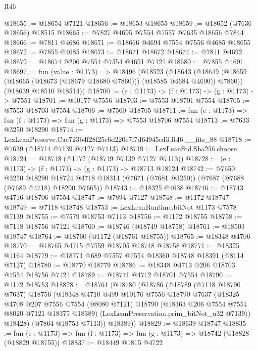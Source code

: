 \begin{lexlean}{R46}
\begin{coremodule}
@18655 := @18654 @7121
@18656 := @18653 @18655
@18659 := @18652 (@7636 @18656) @18515
@18665 := @7827 @4695 @7554 @7557 @7635 @18656 @7844
@18666 := @7811 @4686
@18671 := @18666 @4694 @7554 @7556 @4685 @18655
@18672 := @7855 @4685
@18673 := @18671 @18672
@18674 := @7811 @4692
@18679 := @18674 @206 @7554 @7554 @4691 @7121
@18680 := @7855 @4691
@18697 := fun (value : @1173) =>
  @18496
    (@18523
      (@18643 (@18649 (@18659 (@18665 (@18673 (@18679 @18680 @7860))) (@18585 @4684 @4690)) @7860))
      (@18639 @18510 @18514))
@18700 := (e : @1173) -> (f : @1173) -> (g : @1173) -> @7551
@18701 := @10177 @7556
@18703 := @7553 @18701 @7554
@18705 := @7553 @18703 @7554
@18706 := @7560 @18705
@18711 := fun (e : @1173) => fun (f : @1173) => fun (g : @1173) => @7553 @18706 @7554
@18713 := @7633 @3250 @18290
@18714 := LexLeanPreserve.Cae723b4f28f25c6d220e7f7d64945ed3.R46.__fits_88
@18718 := @7639 (@18714 @7139 @7127 @7113)
@18719 := LexLeanStd.Sha256.choose
@18724 := @18718 (@1172 (@18719 @7139 @7127 @7113))
@18728 := (e : @1173) -> (f : @1173) -> (g : @1173) -> @18713 @18724
@18742 := @7650
    @3250
    @18290
    @18724
    @4718
    @18314
    (@7671 (@7681 @3250))
    (@7687 (@7688 (@7689 @4718) @18290 @7665))
@18743 := @18325 @4638
@18746 := @18743 @4716 @18706 @7554
@18747 := @7894 @7127
@18748 := @1172 @18747
@18749 := @7118 @18748
@18753 := LexLeanRuntime.bitNot @1173 @7578 @7139
@18755 := @7579 @18753 @7113
@18756 := @1172 @18755
@18758 := @7118 @18756 @7121
@18760 := @18746 (@18749 @18758)
@18761 := @18503 @18747
@18764 := @18760 (@1172 (@18761 @18755))
@18765 := @18348 @4706
@18770 := @18765 @4715 @7559 @18705 @18748 @18758
@18771 := @18325 @1164
@18779 := @18771 @689 @7557 @7554 @18360 @18748 @18391 (@8114 @7127)
@18780 := @18770 @18779
@18786 := @18348 @4713 @206 @18703 @7554 @18756 @7121
@18789 := @18771 @4712 @18701 @7554
@18790 := @1172 @18753
@18828 := @18764
    (@18780
      (@18786
        (@18789
          (@7118 @18790 @7637)
          @18756
          (@18348
            @4710
            @499
            @10176
            @7556
            @18790
            @7637
            (@18325
              @4708
              @207
              @7556
              @7554
              (@8080 @7121)
              @18790
              (@18363 @206 @7554 @7554 @8020 @7121 @18375 @18389)
              (LexLeanPreservation.prim_bitNot_u32 @7139))
            @18428)
          (@7864 @18753 @7113))
        @18389))
@18829 := @18639 @18747
@18835 := fun (e : @1173) => fun (f : @1173) => fun (g : @1173) => @18742 (@18828 (@18829 @18755))
@18837 := @18449 @1815 @4722

\end{coremodule}
\end{lexlean}
